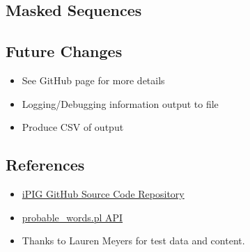 \documentclass[12pt,notitlepage]{article}
\begin{document}
\begin{s5presentation}
\begin{ifhtml}
    \begin{s5slide}
      \section{Masked Sequences}
    \end{s5slide}

    \begin{s5slide}
      \section{Future Changes}
      \begin{itemize}
        \item See GitHub page for more details
        \item Logging/Debugging information output to file
        \item Produce CSV of output
      \end{itemize}
    \end{s5slide}

    \begin{s5slide}
      \section{References}
      \begin{itemize}
      \item \href{http://github.com/r351574nc3/Interdisciplinary-Practical-in-Genomics}{iPIG GitHub Source Code Repository}
      \item \href{http://www.u.arizona.edu/~przybyls/probable_words.html}{probable_words.pl API}
      \item Thanks to Lauren Meyers for test data and content.
      \end{itemize}
    \end{s5slide}

\end{ifhtml}  

  \W \end{s5presentation}
\end{document}
